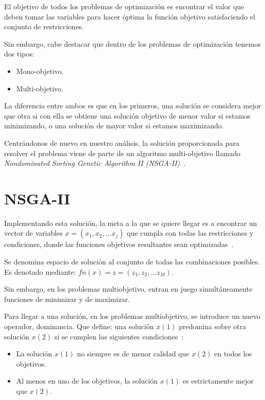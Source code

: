 El objetivo de todos los problemas de optimización es encontrar el valor que deben tomar las variables para hacer óptima la función objetivo satisfaciendo el conjunto de restricciones. 

Sin embargo, cabe destacar que dentro de los problemas de optimización tenemos dos tipos:
\begin{itemize}
	\item Mono-objetivo.
	\item Multi-objetivo.
\end{itemize}

La diferencia entre ambos es que en los primeros, una solución se considera mejor que otra si con ella se obtiene una solución objetivo de menor valor si estamos minimizando, o una solución de mayor valor si estamos maximizando.

Centrándonos de nuevo en nuestro análisis, la solución proporcionada para resolver el problema viene de parte de un algoritmo multi-objetivo llamado \textit{Nondominated Sorting Genetic Algorithm II (NSGA-II)}~\cite{pdf:nsga-ii}.

\section{NSGA-II}

Implementando esta solución, la meta a la que se quiere llegar es a encontrar un vector de variables $x=(x_1,x_2,…x_j)$ que cumpla con todas las restricciones y condiciones, donde las funciones objetivos resultantes sean optimizadas~\cite{pdf:algoritmo}.

Se denomina espacio de solución al conjunto de todas las combinaciones posibles. Es denotado mediante: $fn(x)=z=(z_1,z_2,…z_M)$. 

Sin embargo, en los problemas multiobjetivo, entran en juego simultáneamente funciones de minimizar y de maximizar.

Para llegar a una solución, en los problemas multiobjetivo, se introduce un nuevo operador, dominancia. Que define: una solución 
$x(1)$ predomina sobre otra solución $x(2)$ si se cumplen las siguientes condiciones~\cite{pdf:nsga-ii}:

\begin{itemize}
	\item La solución $x(1)$ no siempre es de menor calidad que $x(2)$ en todos los objetivos.
	\item Al menos en uno de los objetivos, la solución $x(1)$ es estrictamente mejor que $x(2)$.
\end{itemize}

